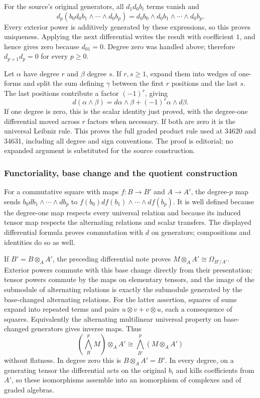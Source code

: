 For the source's original generators, all \(d_1d_0b_i\) terms vanish and \[
d_p(b_0d_0b_1\wedge\cdots\wedge d_0b_p)
=d_0b_0\wedge d_0b_1\wedge\cdots\wedge d_0b_p.
\] Every exterior power is additively generated by these expressions, so this proves uniqueness. Applying the next differential writes the result with coefficient \(1\), and hence gives zero because \(d_01=0\). Degree zero was handled above; therefore \(d_{p+1}d_p=0\) for every \(p\ge0\).

Let \(\alpha\) have degree \(r\) and \(\beta\) degree \(s\). If \(r,s\ge1\), expand them into wedges of one-forms and split the sum defining \(\gamma\) between the first \(r\) positions and the last \(s\). The last positions contribute a factor \((-1)^r\), giving \[
d(\alpha\wedge\beta)=d\alpha\wedge\beta+(-1)^r\alpha\wedge d\beta.
\] If one degree is zero, this is the scalar identity just proved, with the degree-one differential moved across \(r\) factors when necessary. If both are zero it is the universal Leibniz rule. This proves the full graded product rule used at 34620 and 34631, including all degree and sign conventions. The proof is editorial; no expanded argument is substituted for the source construction.

\subsubsection{Functoriality, base change and the quotient construction}\label{algebra-proof-042-functoriality-base-change-and-the-quotient-construction}

For a commutative square with maps \(f:B\to B'\) and \(A\to A'\), the degree-\(p\) map sends \(b_0db_1\wedge\cdots\wedge db_p\) to \(f(b_0)df(b_1)\wedge\cdots\wedge df(b_p)\). It is well defined because the degree-one map respects every universal relation and because its induced tensor map respects the alternating relations and scalar transfers. The displayed differential formula proves commutation with \(d\) on generators; compositions and identities do so as well.

If \(B'=B\otimes_A A'\), the preceding differential note proves \(M\otimes_A A'\cong\Omega_{B'/A'}\). Exterior powers commute with this base change directly from their presentation: tensor powers commute by the maps on elementary tensors, and the image of the submodule of alternating relations is exactly the submodule generated by the base-changed alternating relations. For the latter assertion, squares of sums expand into repeated terms and pairs \(u\otimes v+v\otimes u\), each a consequence of squares. Equivalently the alternating multilinear universal property on base-changed generators gives inverse maps. Thus \[
(\bigwedge_B^pM)\otimes_A A'\cong\bigwedge_{B'}^p(M\otimes_A A')
\] without flatness. In degree zero this is \(B\otimes_A A'=B'\). In every degree, on a generating tensor the differential acts on the original \(b_i\) and kills coefficients from \(A'\), so these isomorphisms assemble into an isomorphism of complexes and of graded algebras.

